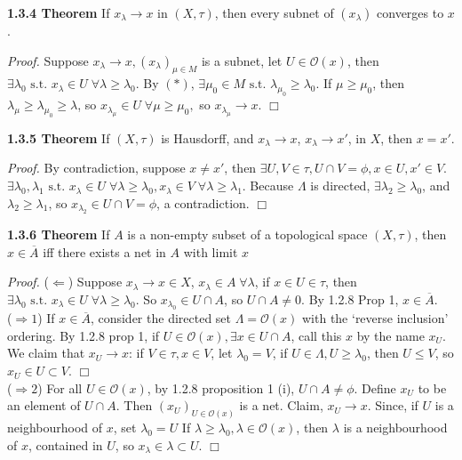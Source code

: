 \documentclass[12pt]{article}
\newcommand{\st}[0]{ \textrm{ s.t. } }
\newcommand{\rimply}[0] { \Rightarrow }
\newcommand{\limply}[0] { \Leftarrow }
\newcommand{\rarw}[0] { \rightarrow }
\newcommand{\curlyO}[0] { \mathcal{O} }
\begin{document}
\begin{flushleft} {\bf 1.3.4 Theorem} If $x_\lambda \rarw x$ in $(X, \tau)$, then every subnet of $(x_\lambda)$ converges to $x$.
\end{flushleft}

\begin{flushleft} \emph{Proof. } Suppose $x_\lambda \rarw x, (x_\lambda)_{\mu \in M}$ is a subnet, let $U \in \curlyO(x)$, then $\exists \lambda_0 \st x_\lambda \in U \; \forall \lambda \ge \lambda_0$. By $(*)$, $\exists \mu_0 \in M \st \lambda_{\mu_0} \ge \lambda_0$. If $\mu \ge \mu_0$, then $\lambda_\mu \ge \lambda_{\mu_0} \ge \lambda$, so $x_{\lambda_\mu} \in U \; \forall \mu \ge \mu_0,$ so $x_{\lambda_\mu} \rarw x$. 
$\Box$
\end{flushleft}


\begin{flushleft} {\bf 1.3.5 Theorem} If $(X, \tau)$ is Hausdorff, and $x_\lambda \rarw x$, $x_\lambda \rarw x'$, in $X$, then $x = x'$.
\end{flushleft}

\begin{flushleft} \emph{Proof. } By contradiction, suppose $x \not = x'$, then $\exists U, V \in \tau, U \cap V = \phi, x \in U, x' \in V$. $\exists \lambda_0, \lambda_1 \st x_\lambda \in U \; \forall \lambda \ge \lambda_0, x_\lambda \in V \; \forall \lambda \ge \lambda_1$. Because $\Lambda$ is directed, $\exists \lambda_2 \ge \lambda_0$, and $\lambda_2 \ge \lambda_1$, so $x_{\lambda_2} \in U \cap V = \phi$, a contradiction. $\Box$
\end{flushleft}

\begin{flushleft} {\bf 1.3.6 Theorem} If $A$ is a non-empty subset of a topological space $(X, \tau)$, then $x \in \overline{A}$ iff there exists a net in $A$ with limit $x$
\end{flushleft}

\begin{flushleft} \emph{Proof. } ($\limply$) Suppose $x_\lambda \rarw x \in X$, $x_\lambda \in A \; \forall \lambda$, if $x \in U \in \tau$, then $\exists \lambda_0 \st x_\lambda \in U \; \forall \lambda \ge \lambda_0$. So $x_{\lambda_0} \in U \cap A$, so $U \cap A \not = 0$. By 1.2.8 Prop 1, $x \in \overline{A}$.  \\
($\rimply 1$) If $x \in \overline{A}$, consider the directed set $\Lambda = \curlyO(x)$ with the `reverse inclusion' ordering. 
By 1.2.8 prop 1, if $U \in \curlyO(x), \exists x \in U \cap A$, call this $x$ by the name $x_U$. 
We claim that $x_U \rarw x$: if $V \in \tau, x \in V$,
 let $\lambda_0 = V$, if $U \in \Lambda, U  \ge \lambda_0$,
 then $U \le V$, so $x_U \in U \subset V$. $\Box$ \\
($\rimply 2$) For all $U \in \curlyO(x)$, by 1.2.8 proposition 1 (i), $U \cap A \not = \phi$. Define $x_U$ to be an element of $U \cap A$. Then $(x_U) _ { U \in \curlyO(x)}$ is a net. Claim, $x_U \rarw x$. Since, if $U$ is a neighbourhood of $x$, set $\lambda_0 = U$ If $\lambda \ge \lambda_0, \lambda \in \curlyO(x)$, then $\lambda$ is a neighbourhood of $x$, contained in $U$, so $x_\lambda \in \lambda \subset U$. $\Box$
\end{flushleft}
\end{document}
